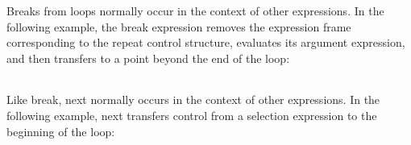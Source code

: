 Breaks from loops normally occur in the context of other
expressions. In the following example, the break expression removes
the expression frame corresponding to the repeat control structure,
evaluates its argument expression, and then transfers to a point
beyond the end of the loop:

\begin{center}
\tablelasttail{\hline}
\begin{xtabular}{|m{1.9073598in}|m{2.75596in}|}

\end{xtabular}
\end{center}

Like break, next normally occurs in the context of other
expressions. In the following example, next transfers control from a
selection expression to the beginning of the loop:

